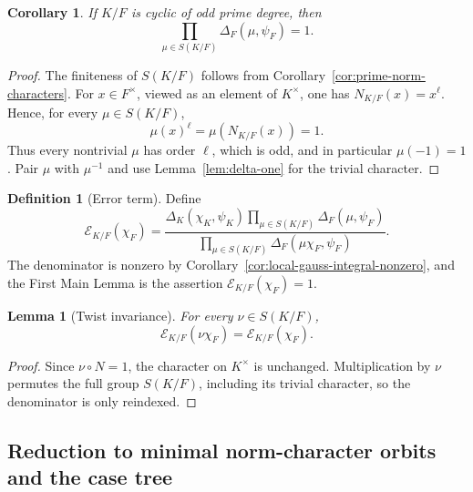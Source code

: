 \documentclass[11pt]{amsart}
\newtheorem{lemma}[theorem]{Lemma}
\newtheorem{corollary}[theorem]{Corollary}
\theoremstyle{definition}
\newtheorem{definition}[theorem]{Definition}
\theoremstyle{remark}
\newcommand{\Err}{\mathcal E}
\begin{document}
\begin{corollary}\label{cor:S-product-one}
If $K/F$ is cyclic of odd prime degree, then
\begin{equation}\label{eq:S-product-one}
 \prod_{\mu\in S(K/F)}\Delta_F(\mu,\psi_F)=1.
\end{equation}
\end{corollary}

\begin{proof}
The finiteness of $S(K/F)$ follows from
Corollary~\ref{cor:prime-norm-characters}.  For $x\in F^\times$,
viewed as an element of $K^\times$, one has
$N_{K/F}(x)=x^\ell$.  Hence, for every $\mu\in S(K/F)$,
\[
 \mu(x)^\ell=\mu(N_{K/F}(x))=1.
\]
Thus every nontrivial $\mu$ has order $\ell$, which is odd, and in
particular $\mu(-1)=1$.  Pair $\mu$ with $\mu^{-1}$ and use
Lemma~\ref{lem:delta-one} for the trivial character.
\end{proof}

\begin{definition}[Error term]
Define
\begin{equation}\label{eq:error-term}
 \Err_{K/F}(\chi_F)=
 \frac{\Delta_K(\chi_K,\psi_K)
       \prod_{\mu\in S(K/F)}\Delta_F(\mu,\psi_F)}
      {\prod_{\mu\in S(K/F)}\Delta_F(\mu\chi_F,\psi_F)}.
\end{equation}
The denominator is nonzero by
Corollary~\ref{cor:local-gauss-integral-nonzero}, and the First Main
Lemma is the assertion $\Err_{K/F}(\chi_F)=1$.
\end{definition}

\begin{lemma}[Twist invariance]\label{lem:twist-invariance}
For every $\nu\in S(K/F)$,
\[
 \Err_{K/F}(\nu\chi_F)=\Err_{K/F}(\chi_F).
\]
\end{lemma}

\begin{proof}
Since $\nu\circ N=1$, the character on $K^\times$ is unchanged.
Multiplication by $\nu$ permutes the full group $S(K/F)$, including its
trivial character, so the denominator is only reindexed.
\end{proof}

\subsection{Reduction to minimal norm-character orbits and the case tree}
\end{document}
